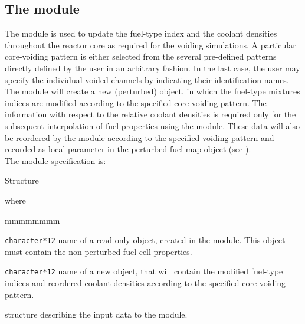 \subsection{The  module}\label{sect:cvr}

\vskip 0.2cm
The  module is used to update the fuel-type index and the coolant densities
throughout the reactor core as required for the voiding simulations. A particular core-voiding
pattern is either selected from the several pre-defined patterns  directly defined by
the user in an arbitrary fashion. In the last case, the user may specify the individual voided
channels by indicating their identification names. The  module will create a new
(perturbed)  object, in which the fuel-type mixtures indices are modified according
to the specified core-voiding pattern. The information with respect to the relative coolant
densities is required only for the subsequent interpolation of fuel properties using the 
module. These data will also be reordered by the  module according to the specified
voiding pattern and recorded as local parameter in the perturbed fuel-map object (see ).\\

\noindent
The  module specification is: 

\begin{DataStructure}{Structure }
 \moc{:=}   \moc{::} 
\end{DataStructure}

\noindent where

\begin{ListeDeDescription}{mmmmmmmm}

\item[\dusa{FMAP}] \texttt{character*12} name of a read-only  object,
created in the  module. This object must contain the non-perturbed
fuel-cell properties.

\item[\dusa{FMAPV}] \texttt{character*12} name of a new  object,
that will contain the modified fuel-type indices and reordered coolant densities
according to the specified core-voiding pattern.

\item[\dstr{descrcvr}] structure describing the input data to the  module.

\end{ListeDeDescription}

